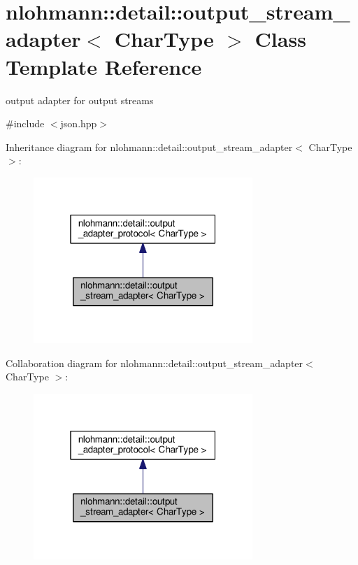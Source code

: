 \hypertarget{classnlohmann_1_1detail_1_1output__stream__adapter}{}\section{nlohmann\+:\+:detail\+:\+:output\+\_\+stream\+\_\+adapter$<$ Char\+Type $>$ Class Template Reference}
\label{classnlohmann_1_1detail_1_1output__stream__adapter}


output adapter for output streams  




{\ttfamily \#include $<$json.\+hpp$>$}



Inheritance diagram for nlohmann\+:\+:detail\+:\+:output\+\_\+stream\+\_\+adapter$<$ Char\+Type $>$\+:
\nopagebreak
\begin{figure}[H]
\begin{center}
\leavevmode
\includegraphics[width=235pt]{classnlohmann_1_1detail_1_1output__stream__adapter__inherit__graph}
\end{center}
\end{figure}


Collaboration diagram for nlohmann\+:\+:detail\+:\+:output\+\_\+stream\+\_\+adapter$<$ Char\+Type $>$\+:
\nopagebreak
\begin{figure}[H]
\begin{center}
\leavevmode
\includegraphics[width=235pt]{classnlohmann_1_1detail_1_1output__stream__adapter__coll__graph}
\end{center}
\end{figure}
